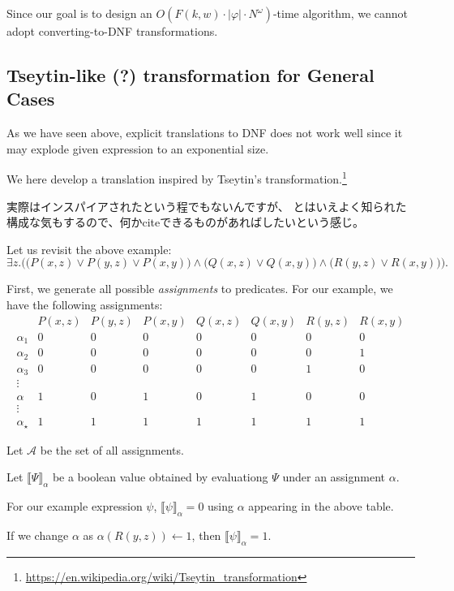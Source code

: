 \documentclass[a4paper,UKenglish,cleveref, autoref, thm-restate]{lipics-v2021}
\newenvironment{Jcomment}%
{\begin{screen}\begin{CJK}{UTF8}{ipxm}}%
{\end{CJK}\end{screen}}
\newcommand{\sem}[1]{\llbracket #1 \rrbracket}
\begin{document}
Since our goal is to design an $O(F(k, w) \cdot |\varphi| \cdot N^{\omega})$-time algorithm, we cannot adopt converting-to-DNF transformations.


\subsection{Tseytin-like (?) transformation for General Cases}

As we have seen above, explicit translations to DNF does not work well since it may explode given expression to an exponential size.

We here develop a translation inspired by Tseytin's transformation.\footnote{\url{https://en.wikipedia.org/wiki/Tseytin_transformation}}

\begin{Jcomment}
    実際はインスパイアされたという程でもないんですが、
    とはいえよく知られた構成な気もするので、何かciteできるものがあればしたいという感じ。
\end{Jcomment}

Let us revisit the above example:
$$
\exists z. \biggl(
\bigl(P(x, z) \lor P(y, z) \lor P(x, y) \bigr)
\land
\bigl(Q(x, z) \lor Q(x, y)\bigr)
\land
\bigl(R(y, z) \lor R(x, y)\bigr)
\biggr).
$$

First, we generate all possible \emph{assignments} to predicates.
For our example, we have the following assignments:
$$
\begin{array}{c|ccccccc}
& P(x, z) & P(y, z) & P(x, y) & Q(x, z) & Q(x, y) & R(y, z) & R(x, y) \\\hline
\alpha_1 & 0 & 0 & 0 & 0 & 0 & 0 & 0 \\
\alpha_2 & 0 & 0 & 0 & 0 & 0 & 0 & 1 \\
\alpha_3 & 0 & 0 & 0 & 0 & 0 & 1 & 0 \\
\vdots \\
\alpha   & 1 & 0 & 1 & 0 & 1 & 0 & 0 \\
\vdots \\
\alpha_{\star}   & 1 & 1 & 1 & 1 & 1 & 1 & 1
\end{array}
$$

Let $\mathcal{A}$ be the set of all assignments.

Let $\sem{\Psi}_{\alpha}$ be a boolean value obtained by evaluationg $\Psi$ under an assignment $\alpha$.

For our example expression $\psi$, $\sem{\psi}_{\alpha} = 0$ using $\alpha$ appearing in the above table.

If we change $\alpha$ as $\alpha(R(y,z)) \gets 1$, then $\sem{\psi}_{\alpha} = 1$.
\end{document}
